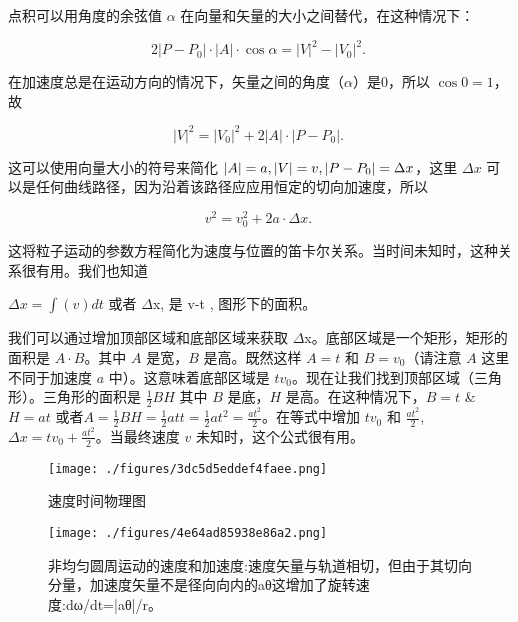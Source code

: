 点积可以用角度的余弦值 $\alpha$ 在向量和矢量的大小之间替代，在这种情况下：

\begin{equation}
2|P - P_0| \cdot |A| \cdot \cos \alpha = |V|^2 - |V_0|^2.~
\end{equation}

在加速度总是在运动方向的情况下，矢量之间的角度（$\alpha$）是0，所以 $\cos 0 = 1$，故

\begin{equation}
|V|^2 = |V_0|^2 + 2|A| \cdot |P - P_0|.~
\end{equation}

这可以使用向量大小的符号来简化 $\\|A\\| = a, \\|V\\| = v, \\|P - P_0\\| = \Delta x$，这里 $\Delta x$ 可以是任何曲线路径，因为沿着该路径应应用恒定的切向加速度，所以

\begin{equation}
v^2 = v_0^2 + 2a \cdot \Delta x.~
\end{equation}

这将粒子运动的参数方程简化为速度与位置的笛卡尔关系。当时间未知时，这种关系很有用。我们也知道

$\Delta x = \int(v)dt$ 或者 $\Delta$x, 是 v-t , 图形下的面积。

我们可以通过增加顶部区域和底部区域来获取 $\Delta$x。底部区域是一个矩形，矩形的面积是 $A \cdot B$。其中 $A$ 是宽，$B$ 是高。既然这样 $A=t$ 和 $B=v_0$（请注意 $A$ 这里不同于加速度 $a$ 中）。这意味着底部区域是 $tv_0$。现在让我们找到顶部区域（三角形）。三角形的面积是 $\frac{1}{2}BH$ 其中 $B$ 是底，$H$ 是高。在这种情况下，$B=t$ & $H=at$ 或者$A = \frac{1}{2}BH = \frac{1}{2}att = \frac{1}{2}at^2 = \frac{at^2}{2}$。在等式中增加 $tv_0$ 和 $\frac{at^2}{2}$,$\Delta x = tv_0 + \frac{at^2}{2}$。当最终速度 $v$ 未知时，这个公式很有用。

\begin{figure}[ht]
\centering
\texttt{[image: ./figures/3dc5d5eddef4faee.png]}
\caption{速度时间物理图} \label{fig_YDX_8}
\end{figure}

\begin{figure}[ht]
\centering
\texttt{[image: ./figures/4e64ad85938e86a2.png]}
\caption{非均匀圆周运动的速度和加速度:速度矢量与轨道相切，但由于其切向分量，加速度矢量不是径向向内的aθ这增加了旋转速度:dω/dt=|aθ|/r。} \label{fig_YDX_9}
\end{figure}


